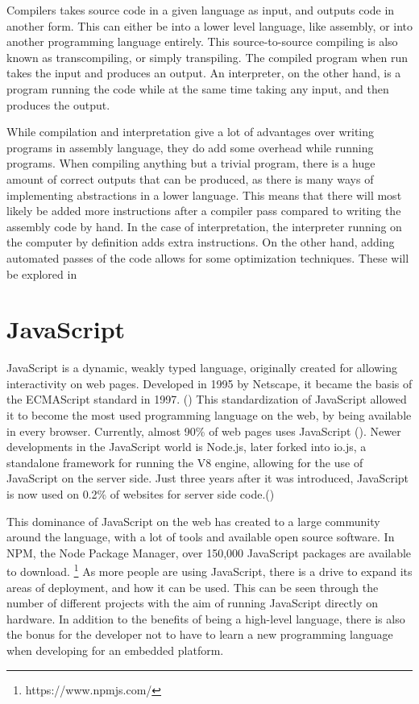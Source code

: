 Compilers takes source code in a given language as input, and outputs code in another form. This can either be into a lower level language, like assembly, or into another programming language entirely.
This source-to-source compiling is also known as transcompiling, or simply transpiling.
The compiled program when run takes the input and produces an output. 
An interpreter, on the other hand, is a program running the code while at the same time taking any input, and then produces the output.

While compilation and interpretation give a lot of advantages over writing programs in assembly language, they do add some overhead while running programs.
When compiling anything but a trivial program, there is a huge amount of correct outputs that can be produced, as there is many ways of implementing abstractions in a lower language.
This means that there will most likely be added more instructions after a compiler pass compared to writing the assembly code by hand.
In the case of interpretation, the interpreter running on the computer by definition adds extra instructions. 
On the other hand, adding automated passes of the code allows for some optimization techniques.
These will be explored in 

\section{JavaScript}
JavaScript is a dynamic, weakly typed language, originally created for allowing interactivity on web pages.
Developed in 1995 by Netscape, it became the basis of the ECMAScript standard in 1997. (\cite{jshistory})
This standardization of JavaScript allowed it to become the most used programming language on the web, by being available in every browser.
Currently, almost 90\% of web pages uses JavaScript (\cite{jsclientstats}).
Newer developments in the JavaScript world is Node.js, later forked into io.js, a standalone framework for running the V8 engine, allowing for the use of JavaScript on the server side.
Just three years after it was introduced, JavaScript is now used on 0.2\% of websites for server side code.(\cite{jsserverstats})

This dominance of JavaScript on the web has created to a large community around the language, with a lot of tools and available open source software.
In NPM, the Node Package Manager, over 150,000 JavaScript packages are available to download. \footnote{https://www.npmjs.com/}
As more people are using JavaScript, there is a drive to expand its areas of deployment, and how it can be used.
This can be seen through the number of different projects with the aim of running JavaScript directly on hardware.
In addition to the benefits of being a high-level language, there is also the bonus for the developer not to have to learn a new programming language when developing for an embedded platform.

